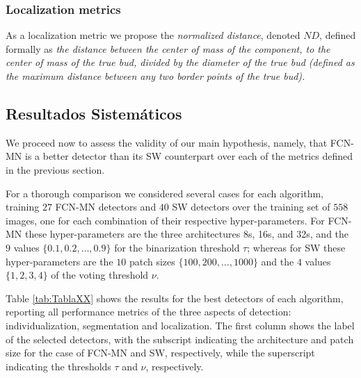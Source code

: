 \documentclass[a4paper,authoryear,review]{elsarticle}
\begin{document}

\subsubsection{Localization metrics} \label{subsec:locmetrics}

As a localization metric we propose the \emph{normalized distance}, denoted $ND$, defined formally as \emph{ the distance between the center of mass of the component, to the center of mass of the true bud, divided by the diameter of the true bud (defined as the maximum distance between any two border points of the true bud).}



\subsection{Resultados Sistemáticos}   \label{sec:resultados}

We proceed now to assess the validity of our main hypothesis, namely, that FCN-MN is a better detector than its SW counterpart over each of the metrics defined in the previous section. 

For a thorough comparison we considered several cases for each algorithm, training $27$ FCN-MN detectors and $40$ SW detectors over the training set of $558$ images, one for each combination of their respective hyper-parameters. For FCN-MN these hyper-parameters are the three architectures 8s, 16s, and 32s, and the $9$ values $\{0.1, 0.2, \ldots, 0.9\}$ for the binarization threshold $\tau$; whereas for SW these hyper-parameters are the $10$ patch sizes $\{100, 200, \ldots, 1000\}$  and the $4$ values $\{1, 2, 3, 4\}$  of the voting threshold $\nu$.


Table \ref{tab:TablaXX} shows the results for the best detectors of each algorithm, reporting all performance metrics of the three aspects of detection: individualization, segmentation and localization. The first column shows the label of the selected detectors, with the subscript indicating the architecture and patch size for the case of FCN-MN and SW, respectively, while the superscript indicating the thresholds $\tau$ and $\nu$, respectively.
\end{document}
